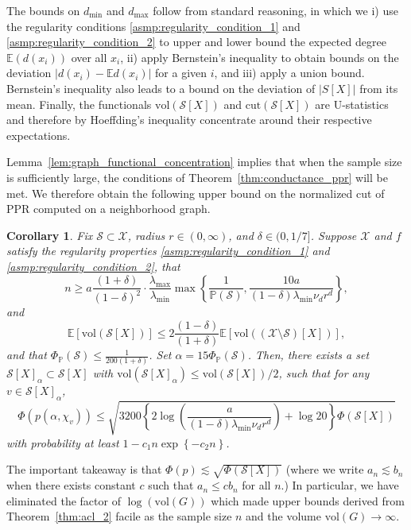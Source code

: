 \documentclass{article}
\newcommand{\abs}[1]{\left \lvert #1 \right \rvert}
\newcommand{\vol}{\mathrm{vol}}
\newcommand{\set}[1]{\left\{#1\right\}}
\newcommand{\Pbb}{\mathbb{P}}
\newcommand{\1}{\mathbf{1}}
\theoremstyle{alden}
\theoremstyle{aldenthm}
\newtheorem{corollary}{Corollary}
\theoremstyle{remark}
\begin{document}
The bounds on $d_{\min}$ and $d_{\max}$ follow from standard reasoning, in which we i) use the regularity conditions \ref{asmp:regularity_condition_1} and \ref{asmp:regularity_condition_2} to upper and lower bound the expected degree $\mathbb{E}(d(x_i))$ over all $x_i$, ii) apply Bernstein's inequality to obtain bounds on the deviation $\abs{d(x_i) - \mathbb{E}d(x_i)}$ for a given $i$, and  iii) apply a union bound. Bernstein's inequality also leads to a bound on the deviation of $\abs{S[X]}$ from its mean. Finally, the functionals $\vol(\mathcal{S}[X])$ and $\mathrm{cut}(\mathcal{S}[X])$ are U-statistics and therefore by Hoeffding's inequality concentrate around their respective expectations.

Lemma~\ref{lem:graph_functional_concentration} implies that when the sample size is sufficiently large, the conditions of Theorem~\ref{thm:conductance_ppr} will be met. We therefore obtain the following upper bound on the normalized cut of PPR computed on a neighborhood graph.
\begin{corollary}
	\label{cor:conductance_ppr_neighborhood_graph}
	Fix $\mathcal{S} \subset \mathcal{X}$, radius $r \in (0,\infty)$, and $\delta \in (0,1/7]$. Suppose $\mathcal{X}$ and $f$ satisfy the regularity properties \ref{asmp:regularity_condition_1} and \ref{asmp:regularity_condition_2}, that
	\begin{equation}
	\label{eqn:graph_functional_concentration_1}
	n \geq a \frac{(1 + \delta)}{(1 - \delta)^2} \cdot \frac{\lambda_{\max}}{\lambda_{\min}} \max\set{\frac{1}{\Pbb(\mathcal{S})}, \frac{10a}{(1-\delta)\lambda_{\min}\nu_dr^d}},
	\end{equation}
	and
	\begin{equation}
	\label{eqn:graph_functional_concentration_2}
	\mathbb{E}[\vol(\mathcal{S}[X])] \leq 2\frac{(1 - \delta)}{(1 + \delta)} \mathbb{E}[\vol((\mathcal{X}\setminus\mathcal{S})[X])],
	\end{equation}
	and that $\Phi_{\Pbb}(\mathcal{S}) \leq \frac{1}{200(1 + \delta)}$. Set $\alpha = 15\Phi_{\Pbb}(\mathcal{S})$. Then, there exists a set $\mathcal{S}[X]_{\alpha} \subset \mathcal{S}[X]$ with $\vol(\mathcal{S}[X]_{\alpha}) \leq \vol(\mathcal{S}[X])/2$, such that for any $v \in \mathcal{S}[X]_{\alpha}$,
	\begin{equation*}
	\Phi(p(\alpha,\chi_v)) \leq \sqrt{3200\left\{2\log\left(\frac{a}{(1 - \delta)\lambda_{\min}\nu_d r^d}\right) + \log 20\right\} \Phi(\mathcal{S}[X])}
	\end{equation*}
	with probability at least $1 - c_1n\exp\set{-c_2n}$.
\end{corollary}
The important takeaway is that $\Phi(p) \lesssim \sqrt{\Phi(\mathcal{S}[X])}$ (where we write $a_n \lesssim b_n$ when there exists constant $c$ such that $a_n \leq c b_n$ for all $n$.) In particular, we have eliminated the factor of $\log(\vol(G))$ which made upper bounds derived from Theorem~\ref{thm:acl_2} facile as the sample size $n$ and the volume $\vol(G) \to \infty$. 
\end{document}
